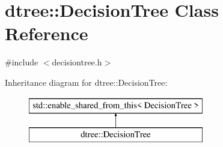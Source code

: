 \hypertarget{classdtree_1_1_decision_tree}{}\section{dtree\+::Decision\+Tree Class Reference}
\label{classdtree_1_1_decision_tree}


{\ttfamily \#include $<$decisiontree.\+h$>$}

Inheritance diagram for dtree\+::Decision\+Tree\+:\begin{figure}[H]
\begin{center}
\leavevmode
\includegraphics[height=2.000000cm]{d4/d98/classdtree_1_1_decision_tree}
\end{center}
\end{figure}

